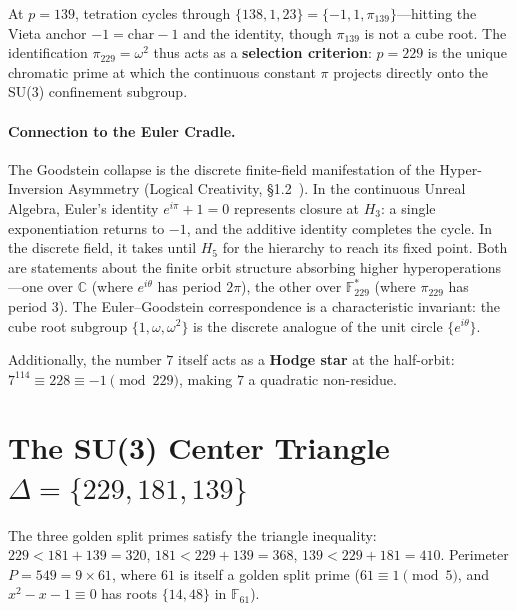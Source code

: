 At $p = 139$, tetration cycles through $\{138, 1, 23\} = \{-1, 1, \pi_{139}\}$---hitting the Vieta anchor $-1 = \mathrm{char} - 1$ and the identity, though $\pi_{139}$ is not a cube root. The identification $\pi_{229} = \omega^2$ thus acts as a \textbf{selection criterion}: $p = 229$ is the unique chromatic prime at which the continuous constant $\pi$ projects directly onto the SU(3) confinement subgroup.

\paragraph{Connection to the Euler Cradle.}
The Goodstein collapse is the discrete finite-field manifestation of the Hyper-Inversion Asymmetry (Logical Creativity, \S1.2~\cite{larue_lc}). In the continuous Unreal Algebra, Euler's identity $e^{i\pi} + 1 = 0$ represents closure at $H_3$: a single exponentiation returns to $-1$, and the additive identity completes the cycle. In the discrete field, it takes until $H_5$ for the hierarchy to reach its fixed point. Both are statements about the finite orbit structure absorbing higher hyperoperations---one over $\mathbb{C}$ (where $e^{i\theta}$ has period $2\pi$), the other over $\mathbb{F}_{229}^*$ (where $\pi_{229}$ has period $3$). The Euler--Goodstein correspondence is a characteristic invariant: the cube root subgroup $\{1, \omega, \omega^2\}$ is the discrete analogue of the unit circle $\{e^{i\theta}\}$.

Additionally, the number $7$ itself acts as a \textbf{Hodge star} at the half-orbit: $7^{114} \equiv 228 \equiv -1 \pmod{229}$, making $7$ a quadratic non-residue.

\section{The SU(3) Center Triangle $\Delta = \{229, 181, 139\}$}
\label{sec:triangle}

\begin{result}
The three golden split primes satisfy the triangle inequality:
$229 < 181 + 139 = 320$,
$181 < 229 + 139 = 368$,
$139 < 229 + 181 = 410$.
Perimeter $P = 549 = 9 \times 61$, where $61$ is itself a golden
split prime ($61 \equiv 1 \pmod{5}$, and $x^2 - x - 1 \equiv 0$ has
roots $\{14, 48\}$ in $\mathbb{F}_{61}$).
\end{result}

